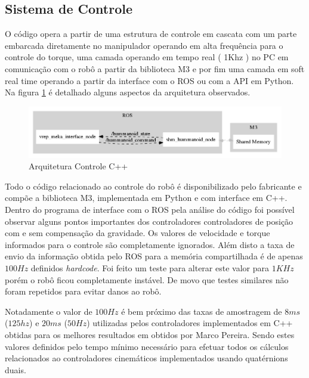 \subsection{Sistema de Controle}


O código opera a partir de uma estrutura de controle em cascata com um parte embarcada diretamente no manipulador operando em alta frequência para o controle do torque, uma camada operando em tempo real ( 1Khz ) no PC em comunicação com o robô a partir da biblioteca M3 e por fim uma camada em soft real time operando a partir da interface com o ROS ou com a API em Python. Na figura \ref{fig:shm_arch} é detalhado alguns aspectos da arquitetura observados.

\begin{figure}[H]
    \centering
    \includegraphics[width=1\linewidth]{figs/shm_arch}
    \caption{Arquitetura Controle C++}
    \label{fig:shm_arch}
\end{figure}

Todo o código relacionado ao controle do robô é disponibilizado pelo fabricante e compõe a biblioteca M3, implementada em Python e com interface em C++. Dentro do programa de interface com o ROS pela análise do código foi possível observar alguns pontos importantes dos controladores controladores de posição com e sem compensação da gravidade. Os valores de velocidade e torque informados para o controle são completamente ignorados. Além disto a taxa de envio da informação obtida pelo ROS para a memória compartilhada é de apenas $100Hz$ definidos \textit{hardcode}. Foi feito um teste para alterar este valor para $1KHz$ porém o robô ficou completamente instável. De movo que testes similares não foram repetidos para evitar danos ao robô.

Notadamente o valor de $100Hz$ é bem próximo das taxas de amostragem de $8 ms$ ($125 hz$) e $20 ms$ ($50 Hz$) utilizadas pelos controladores implementados em C++ obtidas para os melhores resultados em \cite{marcosps2016} obtidos por Marco Pereira. Sendo estes valores definidos pelo tempo mínimo necessário para efetuar todos os cálculos relacionados ao controladores cinemáticos implementados usando quatérnions duais.

